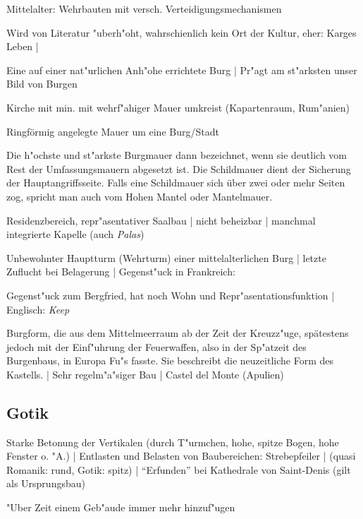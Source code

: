 \documentclass[emulatestandardclasses]{scrartcl}
\begin{document}
\begin{description}[leftmargin=!,labelwidth=\widthof{\bfseries Kirchenburg}]
  \item[Allgemeines] Mittelalter: Wehrbauten mit versch. Verteidigungsmechanismen
  \item[Leben] Wird von Literatur "uberh"oht, wahrschienlich kein Ort der Kultur, eher: Karges Leben | 
  \item[H"ohenburg] Eine auf einer nat"urlichen Anh"ohe errichtete Burg | Pr"agt am st"arksten unser Bild von Burgen 
  \item[Kirchenburg] Kirche mit min. mit wehrf"ahiger Mauer umkreist (Kapartenraum, Rum"anien) 
  \item[Ringmauer] Ringförmig angelegte Mauer um eine Burg/Stadt
  \item[Schildmauer] Die h"ochste und st"arkste Burgmauer dann bezeichnet, wenn sie deutlich vom Rest der Umfassungsmauern abgesetzt ist. Die Schildmauer dient der Sicherung der Hauptangriffsseite. Falls eine Schildmauer sich über zwei oder mehr Seiten zog, spricht man auch vom Hohen Mantel oder Mantelmauer.
  \item[Palatium] Residenzbereich, repr"asentativer Saalbau | nicht beheizbar | manchmal integrierte Kapelle (auch \emph{Palas})
  \item[Bergfried] Unbewohnter Hauptturm (Wehrturm) einer mittelalterlichen Burg | letzte Zuflucht bei Belagerung | Gegenst"uck in Frankreich: \emph{}
  \item[Donjon] Gegenst"uck zum Bergfried, hat noch Wohn und Repr"asentationsfunktion | Englisch: \emph{Keep}
  \item[Kastellburg] Burgform, die aus dem Mittelmeerraum ab der Zeit der Kreuzz"uge, spätestens jedoch mit der Einf"uhrung der Feuerwaffen, also in der Sp"atzeit des Burgenbaus, in Europa Fu"s fasste. Sie beschreibt die neuzeitliche Form des Kastells. | Sehr regelm"a"siger Bau | Castel del Monte (Apulien)
\end{description}

\subsection{Gotik}

\begin{description}[leftmargin=!,labelwidth=\widthof{\bfseries Allgemeines}]
  \item[Allgemeines] Starke Betonung der Vertikalen (durch T"urmchen, hohe, spitze Bogen, hohe Fenster o. "A.) | Entlasten und Belasten von Baubereichen: Strebepfeiler | (quasi Romanik: rund, Gotik: spitz) | "`Erfunden"' bei Kathedrale von Saint-Denis (gilt als Ursprungsbau)
  \item[Additives Formen] "Uber Zeit einem Geb"aude immer mehr hinzuf"ugen
\end{description}
\end{document}
